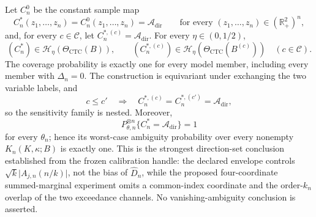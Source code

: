 Let \(C_n^0\) be the constant sample map
\[
 C_n^*(z_1,\ldots,z_n)=C_n^0(z_1,\ldots,z_n)=\mathcal A_{\mathrm{dir}}
 \qquad\text{for every }(z_1,\ldots,z_n)\in(\mathbb R_+^2)^n,
\]
and, for every \(c\in\mathcal C\), let \(C_n^{*,(c)}=\mathcal A_{\mathrm{dir}}\).  For every \(\eta\in(0,1/2)\),
\[
 (C_n^*)\in\mathcal H_\eta(\Theta_{\mathrm{CTC}}(B)),
 \qquad
 (C_n^{*,(c)})\in\mathcal H_\eta(\Theta_{\mathrm{CTC}}(B^{(c)}))
 \quad(c\in\mathcal C).
\]
The coverage probability is exactly one for every model member, including every member with \(\Delta_n=0\).  The construction is equivariant under exchanging the two variable labels, and
\[
 c\leq c'\quad\Longrightarrow\quad
 C_n^{*,(c)}=C_n^{*,(c')}=\mathcal A_{\mathrm{dir}},
\]
so the sensitivity family is nested.  Moreover,
\[
 P_{\theta,n}^{\otimes n}\{C_n^*=\mathcal A_{\mathrm{dir}}\}=1
\]
for every \(\theta_n\); hence its worst-case ambiguity probability over every nonempty \(K_n(K,\kappa;B)\) is exactly one.  This is the strongest direction-set conclusion established from the frozen calibration handle: the declared envelope controls \(\sqrt{k}\lvert A_{j,n}(n/k)\rvert\), not the bias of \(\widehat D_n\), while the proposed four-coordinate summed-marginal experiment omits a common-index coordinate and the order-\(k_n\) overlap of the two exceedance channels.  No vanishing-ambiguity conclusion is asserted.